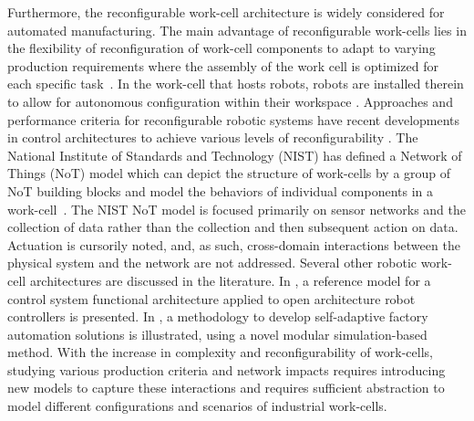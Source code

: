 Furthermore, the reconfigurable work-cell architecture is widely considered for automated manufacturing. The main advantage of reconfigurable work-cells lies in the flexibility of reconfiguration of work-cell components to adapt to varying production requirements where the assembly of the work cell is optimized for each specific task~\cite{Chen2001.rapid}. In the work-cell that hosts robots, robots are installed therein to allow for autonomous configuration within their workspace \cite{Gaspar2017,Molina2017,Ferreira2011}. Approaches and performance criteria for reconfigurable robotic systems have recent developments in control architectures to achieve various levels of reconfigurability \cite{Fulea}. The National Institute of Standards and Technology (NIST) has defined a Network of Things (NoT) model which can depict the structure of work-cells by a group of NoT building blocks and model the behaviors of individual components in a work-cell~\cite{NIST800-183}.  The NIST NoT model is focused primarily on sensor networks and the collection of data rather than the collection and then subsequent action on data.  Actuation is cursorily noted, and, as such, cross-domain interactions between the physical system and the network are not addressed. Several other robotic work-cell architectures are discussed in the literature. In \cite{OpenArch}, a reference model for a control system functional architecture applied to open architecture robot controllers is presented. In \cite{Carpanzano2007}, a methodology to develop self-adaptive factory automation solutions is illustrated, using a novel modular simulation-based method. With the increase in complexity and reconfigurability of work-cells, studying various production criteria and network impacts requires introducing new models to capture these interactions and requires sufficient abstraction to model different configurations and scenarios of industrial work-cells.  

